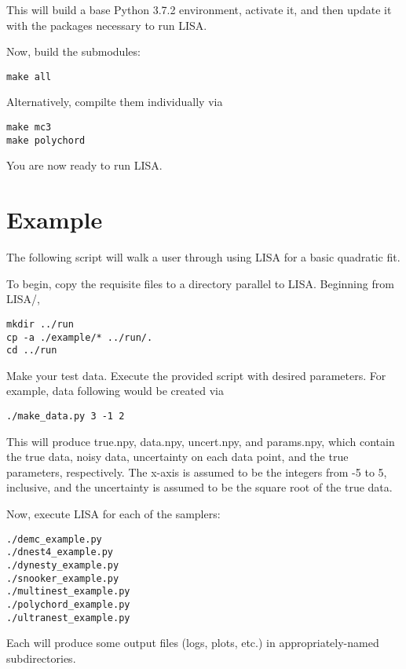 \documentclass[letterpaper, 12pt]{article}
\begin{document}
\noindent This will build a base Python 3.7.2 environment, activate it, and then update 
it with the packages necessary to run LISA.\newline

\noindent Now, build the submodules:

\begin{verbatim}
make all
\end{verbatim}

\noindent Alternatively, compilte them individually via
\begin{verbatim}
make mc3
make polychord
\end{verbatim}

\noindent You are now ready to run LISA.


\section{Example}
\label{sec:example}

The following script will walk a user through using LISA for a basic quadratic 
fit.

\noindent To begin, copy the requisite files to a directory parallel to LISA. 
Beginning from LISA/, 
\begin{verbatim}
mkdir ../run
cp -a ./example/* ../run/.
cd ../run
\end{verbatim}

\noindent Make your test data.  Execute the provided script with 
desired parameters.  For example, data following  
would be created via
\begin{verbatim}
./make_data.py 3 -1 2
\end{verbatim}
\noindent This will produce true.npy, data.npy, uncert.npy, and params.npy, 
which contain the true data, noisy data, uncertainty on each data point, and 
the true parameters, respectively.  The x-axis is assumed to be the integers 
from -5 to 5, inclusive, and the uncertainty is assumed to be the square root 
of the true data.\newline

\noindent Now, execute LISA for each of the samplers:

\begin{verbatim}
./demc_example.py
./dnest4_example.py
./dynesty_example.py
./snooker_example.py
./multinest_example.py
./polychord_example.py
./ultranest_example.py
\end{verbatim}

\noindent Each will produce some output files (logs, plots, etc.) in 
appropriately-named subdirectories.
\end{document}
